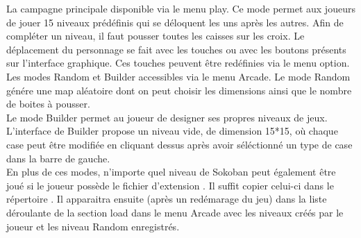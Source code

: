 \documentclass[../main.tex]{subfiles}
\begin{document}
La campagne principale disponible via le menu play. Ce mode permet aux joueurs de jouer
15 niveaux prédéfinis qui se déloquent les uns après les autres. Afin de compléter
un niveau, il faut pousser toutes les caisses sur les croix. Le déplacement du personnage se fait
avec les touches  ou avec les boutons présents sur l'interface graphique. Ces touches 
peuvent être redéfinies via le menu option. \\

Les modes Random et Builder accessibles via le menu Arcade. Le mode Random génére 
une map aléatoire dont on peut choisir les dimensions ainsi que le nombre de boites à pousser. \\
Le mode Builder permet au joueur de designer ses propres niveaux de jeux. \\
L'interface de Builder propose un niveau vide, de dimension 15*15, où chaque case peut être modifiée 
en cliquant dessus après avoir séléctionné un type de case dans la barre de gauche. \\

En plus de ces modes, n'importe quel niveau de Sokoban peut également être joué si le joueur possède le fichier d'extension .
Il suffit copier celui-ci dans le répertoire .
Il apparaitra ensuite (après un redémarage du jeu) dans la liste déroulante de la section load dans le menu Arcade avec les 
niveaux créés par le joueur et les niveau Random enregistrés.
\end{document}
